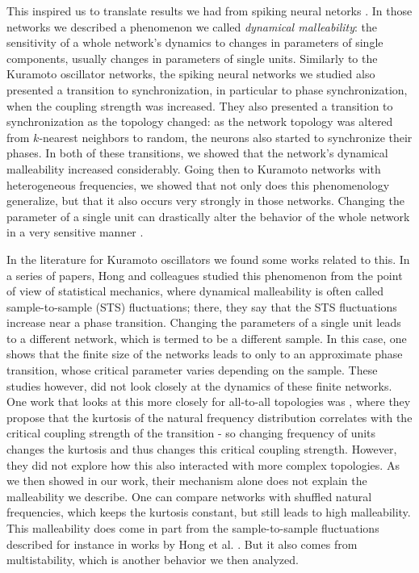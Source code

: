 This inspired us to translate results we had from spiking neural netorks \cite{budzinski2023malleability}. In those networks we described a phenomenon we called \textit{dynamical malleability}: the sensitivity of a whole network's dynamics to changes in parameters of single components, usually changes in parameters of single units. Similarly to the Kuramoto oscillator networks, the spiking neural networks we studied also presented a transition to synchronization, in particular to phase synchronization, when the coupling strength was increased. They also presented a transition to synchronization as the topology changed: as the network topology was altered from $k$-nearest neighbors to random, the neurons also started to synchronize their phases. In both of these transitions, we showed that the network's dynamical malleability increased considerably. Going then to Kuramoto networks with heterogeneous frequencies, we showed that not only does this phenomenology generalize, but that it also occurs very strongly in those networks. Changing the parameter of a single unit can drastically alter the behavior of the whole network in a very sensitive manner \cite{}. 

In the literature for Kuramoto oscillators we found some works related to this. In a series of papers, Hong and colleagues studied this phenomenon from the point of view of statistical mechanics, where dynamical malleability is often called sample-to-sample (STS) fluctuations; there, they say that the STS fluctuations increase near a phase transition. Changing the parameters of a single unit leads to a different network, which is termed to be a different sample. In this case, one shows that the finite size of the networks leads to only to an approximate phase transition, whose critical parameter varies depending on the sample. These studies however, did not look closely at the dynamics of these finite networks. One work that looks at this more closely for all-to-all topologies was , where they propose that the kurtosis of the natural frequency distribution correlates with the critical coupling strength of the transition - so changing frequency of units changes the kurtosis and thus changes this critical coupling strength. However, they did not explore how this also interacted with more complex topologies. As we then showed in our work, their mechanism alone does not explain the malleability we describe. One can compare networks with shuffled natural frequencies, which keeps the kurtosis constant, but still leads to high malleability. This malleability does come in part from the sample-to-sample fluctuations described for instance in works by Hong et al. \cite{hong2007prl}. But it also comes from multistability, which is another behavior we then analyzed. 

